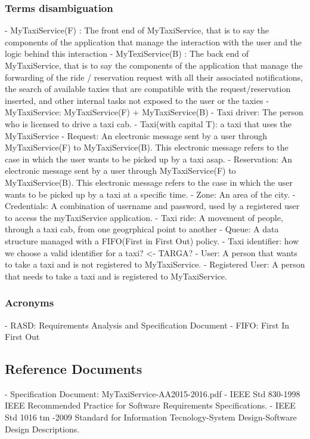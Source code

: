\documentclass[11pt]{article} %
\begin{document}
        \subsubsection{Terms disambiguation}
        - MyTaxiService(F) : The front end of MyTaxiService, that is to say the components
          of the application that manage the interaction with the user and the logic behind
          this interaction
        - MyTexiService(B) : The back end of MyTaxiService, that is to say the components
          of the application that manage the forwarding of the ride / reservation request with all
          their associated notifications, the search of available taxies that are compatible with the request/reservation inserted, and other internal
          tasks not exposed to the user or the taxies
        - MyTaxiService: MyTaxiService(F) + MyTaxiService(B)
        - Taxi driver: The person who is licensed to drive a taxi cab.
        - Taxi(with capital T): a taxi that uses the MyTaxiService
        - Request: An electronic message sent by a user through MyTaxiService(F)
          to MyTaxiService(B). This electronic message refers to the case in which the user wants to be picked up by a taxi asap.
        - Reservation: An electronic message sent by a user through MyTaxiService(F)
           to MyTaxiService(B). This electronic message refers to the case in which the user wants to be picked up by a taxi at a specific time.
        - Zone: An area of the city.
        - Credentials: A combination of username and password, used by a registered user to access the myTaxiService application.
        - Taxi ride: A movement of people, through a taxi cab, from one geogrphical point to another
        - Queue: A data structure managed with a FIFO(First in First Out) policy.
        - Taxi identifier: how we choose a valid identifier for a taxi? <- TARGA?
        - User: A person that wants to take a taxi and is not registered to MyTaxiService.
        - Registered User: A person that needs to take a taxi and is registered to MyTaxiService.

      \subsubsection{Acronyms}
        - RASD: Requirements Analysis and Specification Document
        - FIFO: First In First Out

    \subsection{Reference Documents}
      - Specification Document: MyTaxiService-AA2015-2016.pdf
      - IEEE Std 830-1998 IEEE Recommended Practice for Software Requirements Specifications.
      - IEEE Std 1016 tm -2009 Standard for Information Tecnology-System Design-Software Design Descriptions.
\end{document}
